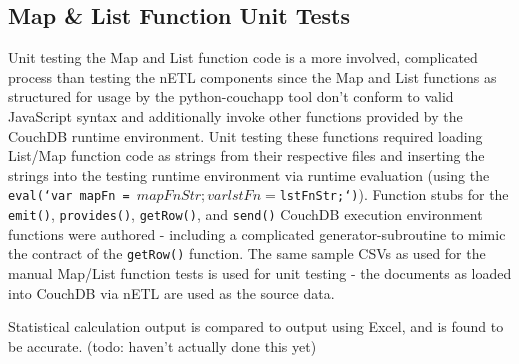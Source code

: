 \subsection{Map \& List Function Unit Tests}
Unit testing the Map and List function code is a more involved, complicated process than testing the nETL components since the Map and List functions as structured for usage by the python-couchapp tool don't conform to valid JavaScript syntax and additionally invoke other functions provided by the CouchDB runtime environment. Unit testing these functions required loading List/Map function code as strings from their respective files and inserting the strings into the testing runtime environment via runtime evaluation (using the \texttt{eval(`var mapFn = ${mapFnStr}; var lstFn = ${lstFnStr};`)}). Function stubs for the \texttt{emit()}, \texttt{provides()}, \texttt{getRow()}, and \texttt{send()} CouchDB execution environment functions were authored - including a complicated generator-subroutine to mimic the contract of the \texttt{getRow()} function. The same sample CSVs as used for the manual Map/List function tests is used for unit testing - the documents as loaded into CouchDB via nETL are used as the source data.

Statistical calculation output is compared to output using Excel, and is found to be accurate. (todo: haven't actually done this yet)